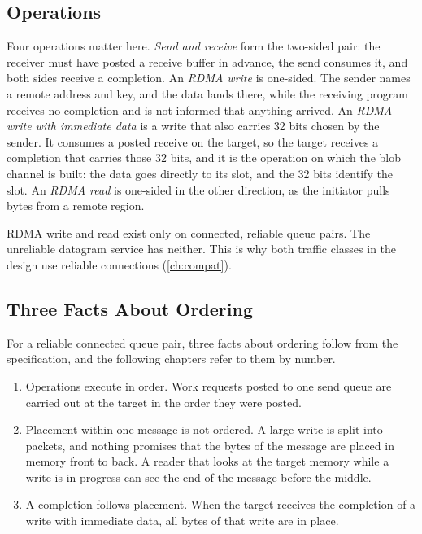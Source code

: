 \subsection{Operations}

Four operations matter here. \emph{Send and receive} form the two-sided
pair: the receiver must have posted a receive buffer in advance, the send
consumes it, and both sides receive a completion. An \emph{RDMA write} is
one-sided. The sender names a remote address and key, and the data lands
there, while the receiving program receives no completion and is not informed
that anything arrived. An \emph{RDMA write with immediate data} is a write
that also carries 32 bits chosen by the sender. It consumes a posted receive
on the target, so the target receives a completion that carries those 32
bits, and it is the operation on which the blob channel is built: the data
goes directly to its slot, and the 32 bits identify the slot. An
\emph{RDMA read} is one-sided in the other direction, as the initiator pulls
bytes from a remote region.

RDMA write and read exist only on connected, reliable queue pairs. The
unreliable datagram service has neither. This is why both traffic classes in
the design use reliable connections (\cref{ch:compat}).

\subsection{Three Facts About Ordering}
\label{sec:ordering}

For a reliable connected queue pair, three facts about ordering follow from the specification, and the following chapters refer to them by number.

\begin{enumerate}
  \item Operations execute in order. Work requests posted to one send
        queue are carried out at the target in the order they were posted.
  \item Placement within one message is not ordered. A large write is
        split into packets, and nothing promises that the bytes of the message
        are placed in memory front to back. A reader that looks at the target
        memory while a write is in progress can see the end of the message
        before the middle.
  \item A completion follows placement. When the target receives the
        completion of a write with immediate data, all bytes of that write are
        in place.
\end{enumerate}

